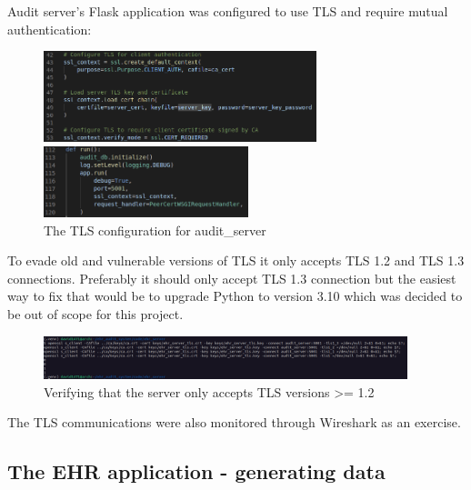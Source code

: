 \documentclass[11pt]{article}
\begin{document}
\begin{flushleft}
Audit server's Flask application was configured to use TLS and require mutual authentication:

\newpage

\begin{figure}[h!]
	\begin{center}
		\includegraphics[width = 300px]{images/server_tls.png}
		
		\vspace{2mm}
		
		\includegraphics[width = 225px]{images/server_ssl_2.png}
		\caption{The TLS configuration for audit\_server}
	\end{center}
\end{figure}

To evade old and vulnerable versions of TLS it only accepts TLS 1.2 and TLS 1.3 connections. Preferably it should only accept TLS 1.3 connection but the easiest way to fix that would be to upgrade Python to version 3.10 which was decided to be out of scope for this project.

\begin{figure}[h!]
	\begin{center}
		\includegraphics[width = 400px]{images/tls_version_verify.png}
		\caption{Verifying that the server only accepts TLS versions >= 1.2}
	\end{center}
\end{figure}

The TLS communications were also monitored through Wireshark as an exercise.

\newpage

\subsection{The EHR application - generating data}


\end{flushleft}
\end{document}
